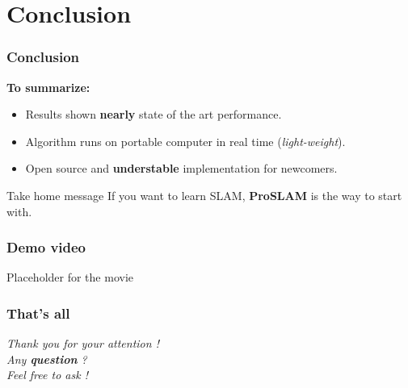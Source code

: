 \documentclass[16pt]{beamer}
\begin{document}
\section{ Conclusion}
\begin{frame}
  \frametitle{Conclusion}
  \textbf{ To summarize: }
  \begin{itemize}
  \item Results shown \textbf{nearly} state of the art performance.
  \item Algorithm runs on portable computer in real time (\textsl{light-weight}).
  \item Open source and \textbf{understable} implementation for newcomers.
  \end{itemize}
  \begin{block}{ Take home message}
    If you want to learn SLAM, \textbf{ProSLAM} is the way to start with.
  \end{block}
\end{frame}

\begin{frame}
  \frametitle{Demo video}
  \begin{center}
  Placeholder for the movie
  \end{center}
\end{frame}

\begin{frame}
  \frametitle{That's all}
  \begin{center}
    \textsl{Thank you for your attention !}\\\bigskip
    \textsl{Any \textbf{question} ?}\\\bigskip
    \textsl{Feel free to ask !}
  \end{center}
\end{frame}
\end{document}
